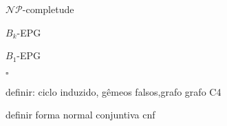 $\mathcal{NP}$-completude

$B_k$-EPG

$B_1$-EPG

 $\square$
 
 
 definir: ciclo induzido, gêmeos falsos,grafo
 grafo C4
 
 
 definir forma normal conjuntiva cnf